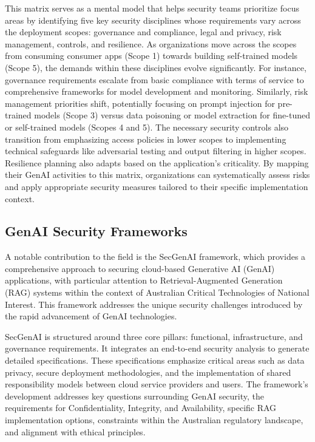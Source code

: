 This matrix serves as a mental model\cite{noauthor_securing_nodate} that helps security teams prioritize focus areas by identifying five key security disciplines whose requirements vary across the deployment scopes: governance and compliance, legal and privacy, risk management, controls, and resilience\cite{noauthor_securing_2023}\cite{noauthor_securing_nodate}. As organizations move across the scopes from consuming consumer apps (Scope 1) towards building self-trained models (Scope 5), the demands within these disciplines evolve significantly. For instance, governance requirements escalate from basic compliance with terms of service to comprehensive frameworks for model development and monitoring. Similarly, risk management priorities shift, potentially focusing on prompt injection for pre-trained models (Scope 3) versus data poisoning or model extraction for fine-tuned or self-trained models (Scopes 4 and 5). The necessary security controls also transition from emphasizing access policies in lower scopes to implementing technical safeguards like adversarial testing and output filtering in higher scopes. Resilience planning also adapts based on the application's criticality. By mapping their GenAI activities to this matrix, organizations can systematically assess risks and apply appropriate security measures tailored to their specific implementation context.

\subsection{GenAI Security Frameworks} %
\label{sec:GenAI Security Frameworks}

A notable contribution to the field is the SecGenAI framework, which provides a comprehensive approach to securing cloud-based Generative AI (GenAI) applications, with particular attention to Retrieval-Augmented Generation (RAG) systems within the context of Australian Critical Technologies of National Interest\cite{haryanto_secgenai_2024}. This framework addresses the unique security challenges introduced by the rapid advancement of GenAI technologies\cite{haryanto_secgenai_2024}.

SecGenAI is structured around three core pillars: functional, infrastructure, and governance requirements\cite{haryanto_secgenai_2024}. It integrates an end-to-end security analysis to generate detailed specifications. These specifications emphasize critical areas such as data privacy, secure deployment methodologies, and the implementation of shared responsibility models between cloud service providers and users\cite{haryanto_secgenai_2024}. The framework's development addresses key questions surrounding GenAI security, the requirements for Confidentiality, Integrity, and Availability, specific RAG implementation options, constraints within the Australian regulatory landscape, and alignment with ethical principles\cite{haryanto_secgenai_2024}.

